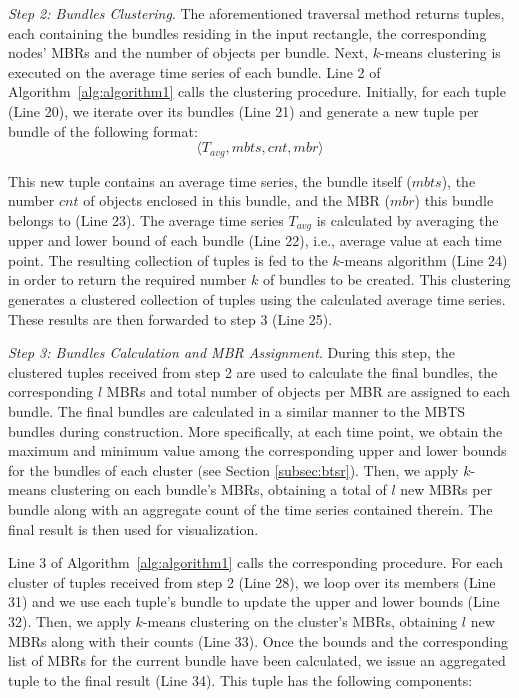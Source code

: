 \vspace{3mm}

\emph{Step 2: Bundles Clustering}.
The aforementioned traversal method returns tuples, each containing the bundles residing in the input rectangle, the corresponding nodes' MBRs and the number of objects per bundle. Next, $k$-means clustering is executed on the average time series of each bundle. Line 2 of Algorithm~\ref{alg:algorithm1} calls the clustering procedure. Initially, for each tuple (Line 20), we iterate over its bundles (Line 21) and generate a new tuple per bundle of the following format: 
\begin{equation*}
\langle T_{avg}, mbts, cnt, mbr \rangle
\end{equation*}

\noindent This new tuple contains an average time series, the bundle itself ($mbts$), the number $cnt$ of objects enclosed in this bundle, and the MBR ($mbr$) this bundle belongs to (Line 23). The average time series $T_{avg}$ is calculated by averaging the upper and lower bound of each bundle (Line 22), i.e., average value at each time point. The resulting collection of tuples is fed to the $k$-means algorithm (Line 24) in order to return the required number $k$ of bundles to be created. This clustering generates a clustered collection of tuples using the calculated average time series. These results are then forwarded to step 3 (Line 25).

\vspace{3mm}

\emph{Step 3: Bundles Calculation and MBR Assignment}.
During this step, the clustered tuples received from step 2 are used to calculate the final bundles, the corresponding $l$ MBRs and total number of objects per MBR are assigned to each bundle. The final bundles are calculated in a similar manner to the MBTS bundles during \btsr construction. More specifically, at each time point, we obtain the maximum and minimum value among the corresponding upper and lower bounds for the bundles of each cluster (see Section \ref{subsec:btsr}). Then, we apply $k$-means clustering on each bundle's MBRs, obtaining a total of $l$ new MBRs per bundle along with an aggregate count of the time series contained therein. The final result is then used for visualization.

Line 3 of Algorithm~\ref{alg:algorithm1} calls the corresponding procedure. For each cluster of tuples received from step 2 (Line 28), we loop over its members (Line 31) and we use each tuple's bundle to update the upper and lower bounds (Line 32). Then, we apply $k$-means clustering on the cluster's MBRs, obtaining $l$ new MBRs along with their counts (Line 33). Once the bounds and the corresponding list of MBRs for the current bundle have been calculated, we issue an aggregated tuple to the final result (Line 34). This tuple has the following components:

